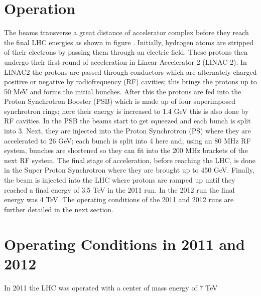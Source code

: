\section{Operation}
The beams transverse a great distance of accelerator complex %
before they reach the final LHC energies as shown in figure .%
Initially, hydrogen atoms are stripped of their electrons by passing them
through an electric field. These protons
then undergo their first round of acceleration in Linear Accelerator 2 (LINAC 2).
In LINAC2 the protons are passed through conductors which
are alternately charged positive or negative by radiofrequency (RF) cavities;
this brings the protons up to 50 MeV and forms the initial bunches. 
After this the protons are
fed into the Proton Synchrotron Booster (PSB) which is made up 
of four superimposed synchrotron rings; here their energy
is increased to 1.4 GeV this is also done by RF cavities. In
the PSB the beams start to get squeezed and each bunch is 
split into 3. 
Next, they are injected into the Proton
Synchrotron (PS) where they are accelerated to 26 GeV; each
bunch is split into 4 here and, using an 80 MHz RF system,
bunches are shortened so they can fit into the 200 MHz brackets
of the next RF system. The final
stage of acceleration, before reaching the LHC, is done in the
Super Proton Synchrotron where they are brought up to 450 GeV.
Finally, the beam is injected into the LHC where protons are ramped
up until they reached a final energy of 3.5 TeV 
in the 2011 run. In the 2012 run the final energy was 4 TeV. 
The operating conditions of the 2011 and 2012 runs are further
detailed in the next section.

\section{Operating Conditions in 2011 and 2012}
\label{sec:Conditions}
In 2011 the LHC was operated with a center of mass energy of 7 TeV
